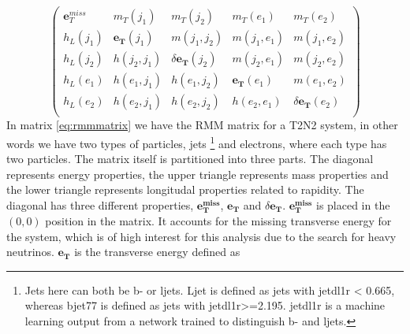 \begin{equation}\label{eq:rmmmatrix}
\begin{pmatrix}
    \boldsymbol{e}_{T}^{miss} & m_T(j_1) & m_T(j_2) &  m_T(e_1) &  m_T(e_2)\\
    h_L(j_1) & \boldsymbol{e_T}(j_1) & m(j_1, j_2) & m(j_1, e_1) & m(j_1, e_2)\\
    h_L(j_2) & h(j_2, j_1) & \delta \boldsymbol{e_T}(j_2)& m(j_2, e_1) & m(j_2, e_2)\\
    h_L(e_1) & h(e_1, j_1) & h(e_1, j_2) & \boldsymbol{e_T}(e_1) & m(e_1, e_2)\\
    h_L(e_2) & h(e_2, j_1) & h(e_2, j_2) & h(e_2, e_1) & \delta \boldsymbol{e_T}(e_2)\\
\end{pmatrix}
\end{equation}
\newline
In matrix \ref{eq:rmmmatrix} we have the RMM matrix for a T2N2 system, in other words we have two types of particles, jets
\footnote{Jets here can both be b- or ljets. Ljet is defined as jets with jetdl1r < 0.665, whereas bjet77 is defined as jets with jetdl1r>=2.195. 
jetdl1r is a machine learning output from a network trained to distinguish b- and ljets.} and electrons, where each type has two particles. 
The matrix itself is partitioned into three parts. 
The diagonal represents energy properties, the upper triangle represents mass properties and the lower triangle represents longitudal 
properties related to rapidity. The diagonal has three different properties, $\boldsymbol{e_T^{miss}}$, $\boldsymbol{e_T}$ and $\delta\boldsymbol{e_T}$. 
$\boldsymbol{e_T^{miss}}$ is placed in the $(0,0)$ position in the matrix. It accounts for the missing transverse energy for the system, which is of 
high interest for this analysis due to the search for heavy neutrinos. $\boldsymbol{e_T}$ is the transverse energy defined as 

